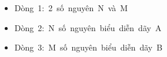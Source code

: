 \begin{itemize}
	\item Dòng 1: 2 số nguyên N và M
	\item Dòng 2: N số nguyên biểu diễn dãy A
	\item Dòng 3: M số nguyên biểu diễn dãy B
\end{itemize}